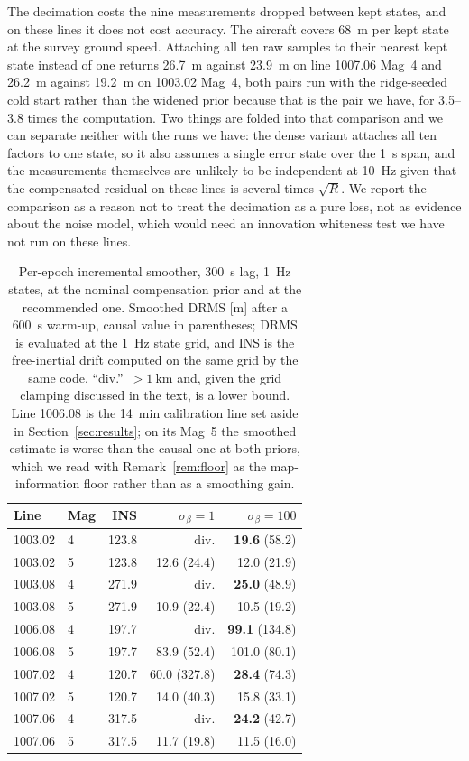 \documentclass{IEEEtaes}
\begin{document}
The decimation costs the nine measurements dropped between kept states, and on
these lines it does not cost accuracy. The aircraft covers \SI{68}{\meter} per
kept state at the survey ground speed. Attaching all ten raw samples to their
nearest kept state instead of one returns \SI{26.7}{\meter} against
\SI{23.9}{\meter} on line 1007.06 Mag~4 and \SI{26.2}{\meter} against
\SI{19.2}{\meter} on 1003.02 Mag~4, both pairs run with the ridge-seeded cold
start rather than the widened prior because that is the pair we have, for \numrange{3.5}{3.8} times the
computation. Two things are folded into that comparison and we can separate
neither with the runs we have: the dense variant attaches all ten factors to one
state, so it also assumes a single error state over the \SI{1}{\second} span, and
the measurements themselves are unlikely to be independent at \SI{10}{\hertz}
given that the compensated residual on these lines is several times $\sqrt{R}$. We
report the comparison as a reason not to treat the decimation as a pure loss, not
as evidence about the noise model, which would need an innovation whiteness test
we have not run on these lines.

\begin{table}[t]
\caption{Per-epoch incremental smoother, \SI{300}{\second} lag, \SI{1}{\hertz}
states, at the nominal compensation prior and at the recommended one. Smoothed DRMS [m]
after a \SI{600}{\second} warm-up, causal value in parentheses; DRMS is evaluated
at the \SI{1}{\hertz} state grid, and INS is the free-inertial drift computed on
the same grid by the same code. ``div.''\ $>\SI{1}{\kilo\meter}$ and, given the
grid clamping discussed in the text, is a lower bound. Line 1006.08 is the
\SI{14}{\minute} calibration line set aside in Section~\ref{sec:results}; on its
Mag~5 the smoothed estimate is worse than the causal one at both priors, which we
read with Remark~\ref{rem:floor} as the map-information floor rather than as a
smoothing gain.}
\label{tab:incprior}
\centering
\setlength{\tabcolsep}{4pt}
\begin{tabular}{llr rr}
\toprule
Line & Mag & INS & $\sigma_{\beta}=1$ & $\sigma_{\beta}=100$ \\
\midrule
1003.02 & 4 & 123.8 & div. & \textbf{19.6} (58.2) \\
1003.02 & 5 & 123.8 & 12.6 (24.4) & 12.0 (21.9) \\
1003.08 & 4 & 271.9 & div. & \textbf{25.0} (48.9) \\
1003.08 & 5 & 271.9 & 10.9 (22.4) & 10.5 (19.2) \\
1006.08 & 4 & 197.7 & div. & \textbf{99.1} (134.8) \\
1006.08 & 5 & 197.7 & 83.9 (52.4) & 101.0 (80.1) \\
1007.02 & 4 & 120.7 & 60.0 (327.8) & \textbf{28.4} (74.3) \\
1007.02 & 5 & 120.7 & 14.0 (40.3) & 15.8 (33.1) \\
1007.06 & 4 & 317.5 & div. & \textbf{24.2} (42.7) \\
1007.06 & 5 & 317.5 & 11.7 (19.8) & 11.5 (16.0) \\
\bottomrule
\end{tabular}
\end{table}
\end{document}
